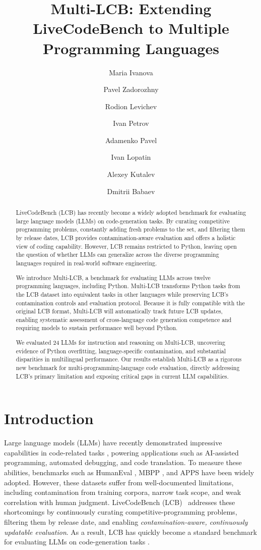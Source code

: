 \documentclass{llmxive}
\title{Multi-LCB: Extending LiveCodeBench to Multiple Programming Languages}
\author{Maria Ivanova \and Pavel Zadorozhny \and Rodion Levichev \and Ivan Petrov \and Adamenko Pavel \and Ivan Lopatin \and Alexey Kutalev \and Dmitrii Babaev}
\begin{document}
\maketitle
\begin{abstract}
LiveCodeBench (LCB) has recently become a widely adopted benchmark for evaluating large language models (LLMs) on code-generation tasks. By curating competitive programming problems, constantly adding fresh problems to the set, and filtering them by release dates, LCB provides contamination-aware evaluation and offers a holistic view of coding capability. However, LCB remains restricted to Python, leaving open the question of whether LLMs can generalize across the diverse programming languages required in real-world software engineering.


We introduce Multi-LCB, a benchmark for evaluating LLMs across twelve programming languages, including Python.
Multi-LCB transforms Python tasks from the LCB dataset into equivalent tasks in other languages while preserving LCB’s contamination controls and evaluation protocol.
Because it is fully compatible with the original LCB format, Multi-LCB will automatically track future LCB updates, enabling systematic assessment of cross-language code generation competence and requiring models to sustain performance well beyond Python.

We evaluated 24 LLMs for instruction and reasoning on Multi-LCB, uncovering evidence of Python overfitting, language-specific contamination, and substantial disparities in multilingual performance. Our results establish Multi-LCB as a rigorous new benchmark for multi-programming-language code evaluation, directly addressing LCB’s primary limitation and exposing critical gaps in current LLM capabilities. %
\end{abstract}
\section{Introduction}
Large language models (LLMs) have recently demonstrated impressive capabilities in code-related tasks \citep{ridnik2024code, lozhkov2024starcoder, roziere2023code, li2022competition, nijkamp2022codegen}, powering applications such as AI-assisted programming, automated debugging, and code translation. To measure these abilities, benchmarks such as HumanEval \citep{chen2021evaluating}, MBPP \citep{austin2021program}, and APPS \citep{hendrycks2021measuring} have been widely adopted. However, these datasets suffer from well-documented limitations, including contamination from training corpora, narrow task scope, and weak correlation with human judgment.  
LiveCodeBench (LCB)~\citep{jain2024livecodebench} addresses these shortcomings by continuously curating competitive-programming problems, filtering them by release date, and enabling \textit{contamination-aware, continuously updatable evaluation}. As a result, LCB has quickly become a standard benchmark for evaluating LLMs on code-generation tasks \citep{kavukcuoglu2025, deepseek2025r1_0528}.
\end{document}
